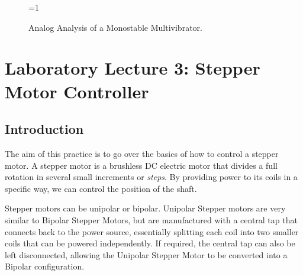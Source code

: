 \documentclass[a4paper, 11pt, oneside]{article}
\begin{document}
\begin{figure}[H]
    \centering
    
    \ifnum\value{ANIMATION}=1 {
    } 
    \fi
    
    \caption{Analog Analysis of a Monostable Multivibrator.}
    \label{fig:555_MONO_ASSEMBLY}
\end{figure}

\clearpage


\section{Laboratory Lecture 3: Stepper Motor Controller}

\subsection{Introduction}

The aim of this practice is to go over the basics of how to control a stepper motor. A stepper motor is a brushless DC electric motor that divides a full rotation in several small increments or \textit{steps}. By providing power to its coils in a specific way, we can control the position of the shaft.\medskip

Stepper motors can be unipolar or bipolar. Unipolar Stepper motors are very similar to Bipolar Stepper Motors, but are manufactured with a central tap that connects back to the power source, essentially splitting each coil into two smaller coils that can be powered independently. If required, the central tap can also be left disconnected, allowing the Unipolar Stepper Motor to be converted into a Bipolar configuration.\medskip
\end{document}
